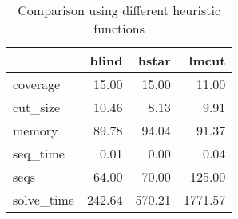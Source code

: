 \begin{table}[htbp]
\centering
\begingroup\small
\begin{tabular}{lrrr}
  \hline
 & blind & hstar & lmcut \\ 
  \hline
coverage & 15.00 & 15.00 & 11.00 \\ 
  cut\_size & 10.46 & 8.13 & 9.91 \\ 
  memory & 89.78 & 94.04 & 91.37 \\ 
  seq\_time & 0.01 & 0.00 & 0.04 \\ 
  seqs & 64.00 & 70.00 & 125.00 \\ 
  solve\_time & 242.64 & 570.21 & 1771.57 \\ 
   \hline
\end{tabular}
\endgroup
\caption{Comparison using different heuristic functions} 
\label{tab:summary_heuristics}
\end{table}

